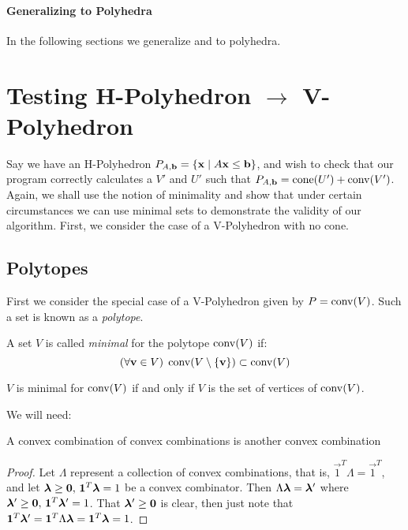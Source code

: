 \paragraph{\Large{Generalizing to Polyhedra}}

In the following sections we generalize  and  to polyhedra.

\section{Testing H-Polyhedron $\to$ V-Polyhedron}

Say we have an H-Polyhedron $P_{A,\mathbf{b}} = \left\{\mathbf{x}\;|\; A\mathbf{x}\leq \mathbf{b}\right\}$, and wish to check that our program correctly calculates a $V'$ and $U'$ such that $P_{A,\mathbf{b}} = \operatorname{cone}(U') + \operatorname{conv}(V')$.  Again, we shall use the notion of minimality and show that under certain circumstances we can use minimal sets to demonstrate the validity of our algorithm.  First, we consider the case of a V-Polyhedron with no cone.

\subsection{Polytopes}

First we consider the special case of a V-Polyhedron given by $P = \operatorname{conv}(V)$.  Such a set is known as a \textit{polytope}.

\begin{Def}
	A set $V$ is called \textit{minimal} for the polytope $\operatorname{conv}(V)$ if:
	\[(\forall \mathbf{v}\in V)\; \operatorname{conv}(V\setminus\left\{\mathbf{v}\right\}) \subset \operatorname{conv}(V)\]
\end{Def}

\begin{Prop}\label{min_conv}
	$V$ is minimal for $\operatorname{conv}(V)$ if and only if $V$ is the set of vertices of $\operatorname{conv}(V)$.
\end{Prop}

We will need:

\begin{Prop}\label{conv_conv}
	A convex combination of convex combinations is another convex combination
\end{Prop}

\begin{proof}
	Let $\Lambda$ represent a collection of convex combinations, that is, $\vec{1}^T\Lambda = \vec{1}^T$, and let $\bm{\lambda}\geq\mathbf{0},\,\mathbf{1}^T\bm{\lambda} = 1$ be a convex combinator.  Then $\Lambda\bm{\lambda} = \bm{\lambda}'$ where $\bm{\lambda}'\geq\mathbf{0},\,\mathbf{1}^T\bm{\lambda}'=1$.  That $\bm{\lambda}'\geq\mathbf{0}$ is clear, then just note that $\mathbf{1}^T\bm{\lambda}' = \mathbf{1}^T\Lambda\bm{\lambda} = \mathbf{1}^T\bm{\lambda} = 1$.
\end{proof}

